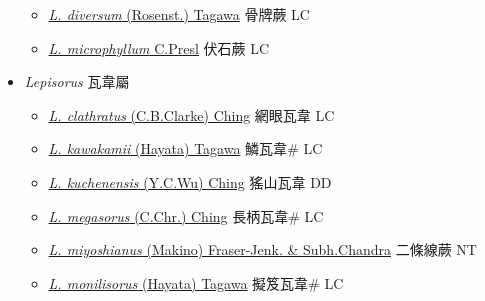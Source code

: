 \begin{itemize}
  \begin{itemize}
        \item[] \href{http://www.theplantlist.org/tpl1.1/search?q=Lemmaphyllum+diversum}{\textit{L. diversum} (Rosenst.) Tagawa}   骨牌蕨 LC
        \item[] \href{http://www.theplantlist.org/tpl1.1/search?q=Lemmaphyllum+microphyllum}{\textit{L. microphyllum} C.Presl}   伏石蕨 LC
  \end{itemize}
 \item[] \textit{Lepisorus} 瓦韋屬
                    
  \begin{itemize}
        \item[] \href{http://www.theplantlist.org/tpl1.1/search?q=Lepisorus+clathratus}{\textit{L. clathratus} (C.B.Clarke) Ching}   網眼瓦韋 LC
        \item[] \href{http://www.theplantlist.org/tpl1.1/search?q=Lepisorus+kawakamii}{\textit{L. kawakamii} (Hayata) Tagawa}   鱗瓦韋\# LC
        \item[] \href{http://www.theplantlist.org/tpl1.1/search?q=Lepisorus+kuchenensis}{\textit{L. kuchenensis} (Y.C.Wu) Ching}   猺山瓦韋 DD
        \item[] \href{http://www.theplantlist.org/tpl1.1/search?q=Lepisorus+megasorus}{\textit{L. megasorus} (C.Chr.) Ching}   長柄瓦韋\# LC
        \item[] \href{http://www.theplantlist.org/tpl1.1/search?q=Lepisorus+miyoshianus}{\textit{L. miyoshianus} (Makino) Fraser-Jenk. \& Subh.Chandra}     二條線蕨 NT
        \item[] \href{http://www.theplantlist.org/tpl1.1/search?q=Lepisorus+monilisorus}{\textit{L. monilisorus} (Hayata) Tagawa}   擬笈瓦韋\# LC

\end{itemize}
\end{itemize}
